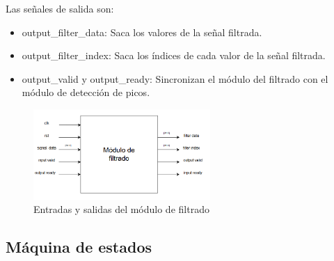 Las señales de salida son:

\begin{itemize}
    \item output\_filter\_data: Saca los valores de la señal filtrada.
    \item output\_filter\_index: Saca los índices de cada valor de la señal filtrada.
    \item output\_valid y output\_ready: Sincronizan el módulo del filtrado con el módulo de detección de picos.
\end{itemize}

\begin{figure}[h!]
    \centering
    \includegraphics[width=0.6\textwidth]{./Images/img_implementacion_hw/diagramamodulofiltrado.png}
    \caption{Entradas y salidas del módulo de filtrado}
    \label{fig:modfiltrado}
\end{figure} 

\subsection{Máquina de estados}

